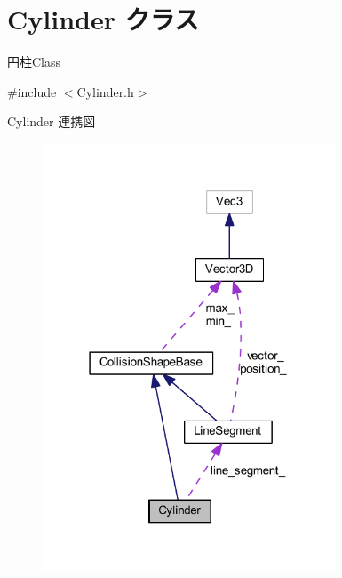 \hypertarget{class_cylinder}{}\section{Cylinder クラス}
\label{class_cylinder}


円柱\+Class  




{\ttfamily \#include $<$Cylinder.\+h$>$}



Cylinder 連携図\nopagebreak
\begin{figure}[H]
\begin{center}
\leavevmode
\includegraphics[width=247pt]{class_cylinder__coll__graph}
\end{center}
\end{figure}
